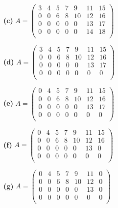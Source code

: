 \documentclass[oneside,12pt]{amsart}
\begin{document}
\bigskip
\bigskip
\bigskip
\bigskip
\bigskip
\bigskip

\textbf{(c)}
$
A =
\begin{pmatrix}
3 & 4 & 5 &  7 &  9  &  11  &  15\\
0 & 0 & 6 &  8 & 10  &  12  &  16\\
0 & 0 & 0 &  0 &  0  &  13  &  17\\
0 & 0 & 0 &  0 &  0  &  14  &  18\\
\end{pmatrix}
$

\bigskip
\bigskip
\bigskip
\bigskip
\bigskip
\bigskip

\textbf{(d)}
$
A =
\begin{pmatrix}
3 & 4 & 5 &  7 &  9  &  11  &   15 \\
0 & 0 & 6 &  8 & 10  &  12  &   16 \\
0 & 0 & 0 &  0 &  0  &  13  &   17 \\
0 & 0 & 0 &  0 &  0  &  0   &    0 \\
\end{pmatrix}
$

\bigskip
\bigskip
\bigskip
\bigskip
\bigskip
\bigskip

\textbf{(e)}
$
A =
\begin{pmatrix}
0 & 4 & 5 &  7 &  9  &  11  &   15 \\
0 & 0 & 6 &  8 & 10  &  12  &   16 \\
0 & 0 & 0 &  0 &  0  &  13  &   17 \\
0 & 0 & 0 &  0 &  0  &  0   &    0 \\
\end{pmatrix}
$

\bigskip
\bigskip
\bigskip
\bigskip
\bigskip
\bigskip

\textbf{(f)}
$
A =
\begin{pmatrix}
0 & 4 & 5 &  7 &  9  &  11  &   15 \\
0 & 0 & 6 &  8 & 10  &  12  &   16 \\
0 & 0 & 0 &  0 &  0  &  13  &   0 \\
0 & 0 & 0 &  0 &  0  &  0   &    0 \\
\end{pmatrix}
$

\bigskip
\bigskip
\bigskip
\bigskip
\bigskip
\bigskip

\textbf{(g)}
$
A =
\begin{pmatrix}
0 & 4 & 5 &  7 &  9  &  11  &   0 \\
0 & 0 & 6 &  8 & 10  &  12  &   0 \\
0 & 0 & 0 &  0 &  0  &  13  &   0 \\
0 & 0 & 0 &  0 &  0  &  0   &   0 \\
\end{pmatrix}
$
\end{document}
